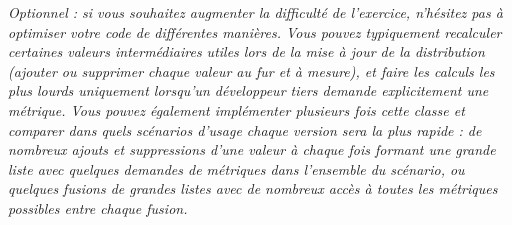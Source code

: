 \bigskip

\textit{Optionnel : si vous souhaitez augmenter la difficulté de l'exercice, n'hésitez pas à optimiser votre code de différentes manières.
Vous pouvez typiquement recalculer certaines valeurs intermédiaires utiles lors de la mise à jour de la distribution (ajouter ou supprimer chaque valeur au fur et à mesure), et faire les calculs les plus lourds uniquement lorsqu'un développeur tiers demande explicitement une métrique.
Vous pouvez également implémenter plusieurs fois cette classe et comparer dans quels scénarios d'usage chaque version sera la plus rapide : de nombreux ajouts et suppressions d'une valeur à chaque fois formant une grande liste avec quelques demandes de métriques dans l'ensemble du scénario, ou quelques fusions de grandes listes avec de nombreux accès à toutes les métriques possibles entre chaque fusion.}
